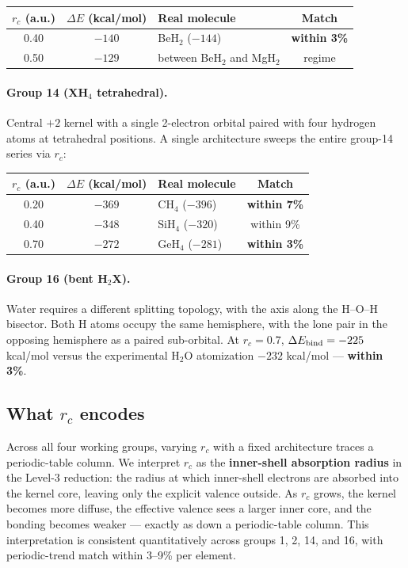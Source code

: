 \documentclass[11pt]{article}
\begin{document}
\begin{center}
\begin{tabular}{c c l c}
\toprule
$r_c$ (a.u.) & $\Delta E$ (kcal/mol) & Real molecule & Match \\
\midrule
0.40 & $-140$ & BeH$_2$ ($-144$) & \textbf{within 3\%} \\
0.50 & $-129$ & between BeH$_2$ and MgH$_2$ & regime \\
\bottomrule
\end{tabular}
\end{center}

\paragraph{Group 14 (XH$_4$ tetrahedral).}
Central $+2$ kernel with a single 2-electron orbital paired with four hydrogen atoms at tetrahedral positions. A single architecture sweeps the entire group-14 series via $r_c$:

\begin{center}
\begin{tabular}{c c l c}
\toprule
$r_c$ (a.u.) & $\Delta E$ (kcal/mol) & Real molecule & Match \\
\midrule
0.20 & $-369$ & CH$_4$ ($-396$) & \textbf{within 7\%} \\
0.40 & $-348$ & SiH$_4$ ($-320$) & within 9\% \\
0.70 & $-272$ & GeH$_4$ ($-281$) & \textbf{within 3\%} \\
\bottomrule
\end{tabular}
\end{center}

\paragraph{Group 16 (bent H$_2$X).}
Water requires a different splitting topology, with the axis along the H--O--H bisector. Both H atoms occupy the same hemisphere, with the lone pair in the opposing hemisphere as a paired sub-orbital. At $r_c = 0.7$, $\Delta E_{\rm bind} = -225$ kcal/mol versus the experimental H$_2$O atomization $-232$ kcal/mol --- \textbf{within 3\%}.

\subsection{What $r_c$ encodes}

Across all four working groups, varying $r_c$ with a fixed architecture traces a periodic-table column. We interpret $r_c$ as the \textbf{inner-shell absorption radius} in the Level-3 reduction: the radius at which inner-shell electrons are absorbed into the kernel core, leaving only the explicit valence outside. As $r_c$ grows, the kernel becomes more diffuse, the effective valence sees a larger inner core, and the bonding becomes weaker --- exactly as down a periodic-table column. This interpretation is consistent quantitatively across groups 1, 2, 14, and 16, with periodic-trend match within 3--9\% per element.
\end{document}
